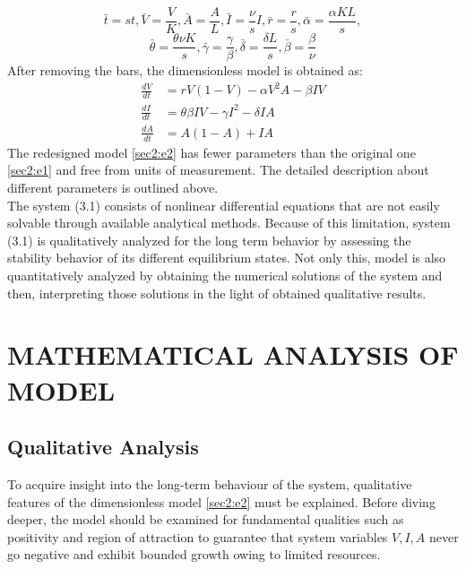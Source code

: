\documentclass[12pt,a4wide]{report}
\numberwithin{equation}{chapter}
\numberwithin{theorem}{chapter}
\begin{document}
\begin{equation*}
\bar t=st, \bar V=\frac{V}{K}, \bar A=\frac{A}{L}, \bar I=\frac{\nu}{s}I, \bar r=\frac{r}{s}, \bar \alpha=\frac{\alpha KL}{s},
\end{equation*}
\begin{equation*}
 \bar \theta=\frac{\theta \nu K}{s}, \bar \gamma =\frac{\gamma}{\beta}, \bar \delta=\frac{\delta L}{s}, \bar \beta=\frac{\beta}{\nu}
\end{equation*}
After removing the bars, the dimensionless model is obtained as:
 \begin{subequations}\label{sec2:e2}
	\begin{align}
	\label{sec2:e2a} \frac{dV}{dt}&=rV(1-V)-\alpha V^2A - \beta IV\\
	\label{sec2:e2b} \frac{dI}{dt}&=\theta \beta IV - \gamma I^2 - \delta IA\\
	\label{sec2:e2c} \frac{dA}{dt}&=A(1-A)+IA
	\end{align}
\end{subequations}
The redesigned model \eqref{sec2:e2} has fewer parameters than the original one \eqref{sec2:e1} and free from units of measurement.
The detailed description about different parameters is outlined above.\\
The system (3.1) consists of nonlinear differential equations that are not easily solvable through available analytical methods. Because of this limitation, system (3.1) is qualitatively analyzed for the long term behavior by assessing the stability behavior of its different equilibrium states. Not only this, model is also quantitatively analyzed by obtaining the numerical solutions of the system and then, interpreting those solutions in the light of obtained qualitative results.

\chapter[MATHEMATICAL ANALYSIS OF MODEL]{MATHEMATICAL ANALYSIS OF MODEL} 
\section{Qualitative Analysis}
To acquire insight into the long-term behaviour of the system, qualitative features of the dimensionless model \eqref{sec2:e2} must be explained. Before diving deeper, the model should be examined for fundamental qualities such as positivity and region of attraction to guarantee that system variables $V,I,A$ never go negative and exhibit bounded growth owing to limited resources.
\end{document}
